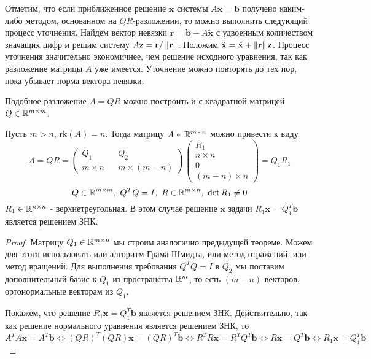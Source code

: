 \begin{remark}
  Отметим, что если приближенное решение $\mathbf{x}$ системы $A\mathbf{x}=\mathbf{b}$
  получено каким-либо методом, основанном на $QR$-разложении, то можно выполнить
  следующий процесс уточнения. Найдем вектор невязки $\mathbf{r}=\mathbf{b}-A\tilde{\mathbf{x}}$
  с удвоенным количеством значащих цифр и решим систему $A\mathbf{z}=\mathbf{r}/\left\lVert\mathbf{r}\right\rVert$.
  Положим $\tilde{\mathbf{x}}=\tilde{\mathbf{x}}+\left\lVert\mathbf{r}\right\rVert\mathbf{z}$.
  Процесс уточнения значительно экономичнее, чем решение
  исходного уравнения, так как разложение матрицы $A$ уже имеется. Уточнение
  можно повторять до тех пор, пока убывает норма вектора невязки.
\end{remark}

Подобное разложение $A=QR$ можно построить и с квадратной матрицей $Q\in\mathbb{R}^{m\times m}$.
\begin{theorem}
  Пусть $m>n$, $\text{rk}(A)=n$. Тогда матрицу $A\in\mathbb{R}^{m\times n}$
  можно привести к виду
  \[A=QR=\left(\begin{array}{cc|c}
        Q_1       &  & Q_2           \\
        m\times n &  & m\times (m-n)
      \end{array}\right)
    \left(\begin{array}{c}
        R_1       \\
        n\times n \\
        \hline
        0         \\
        (m - n) \times n
      \end{array}\right)=Q_1R_1\]
  \[Q\in\mathbb{R}^{m\times m},\ Q^TQ=I,\ R\in\mathbb{R}^{m\times n},\ \det R_1\neq0\]
  $R_1\in\mathbb{R}^{n\times n}$ - верхнетреугольная. В этом
  случае решение $\mathbf{x}$ задачи $R_1\mathbf{x}=Q_1^T\mathbf{b}$ является решением ЗНК.
\end{theorem}
\begin{proof}
  Матрицу $Q_1\in\mathbb{R}^{m\times n}$ мы строим аналогично предыдущей теореме.
  Можем для этого использовать или алгоритм Грама-Шмидта,
  или метод отражений, или метод вращений.
  Для выполнения требования $Q^TQ=I$ в $Q_2$ мы поставим
  дополнительный базис к $Q_1$ из пространства $\mathbb{R}^m$,
  то есть $(m-n)$ векторов, ортонормальные векторам из $Q_1$.

  Покажем, что решение $R_1\mathbf{x}=Q_1^T\mathbf{b}$ является решением ЗНК.
  Действительно, так как решение нормального уравнения является решением ЗНК, то
  \[A^TA\mathbf{x}=A^T\mathbf{b}\Leftrightarrow (QR)^T(QR)\mathbf{x}=(QR)^T\mathbf{b}\Leftrightarrow R^TR\mathbf{x}=R^TQ^T\mathbf{b}\Leftrightarrow R\mathbf{x}=Q^T\mathbf{b}\Leftrightarrow R_1\mathbf{x}=Q_1^T\mathbf{b}\]
\end{proof}
